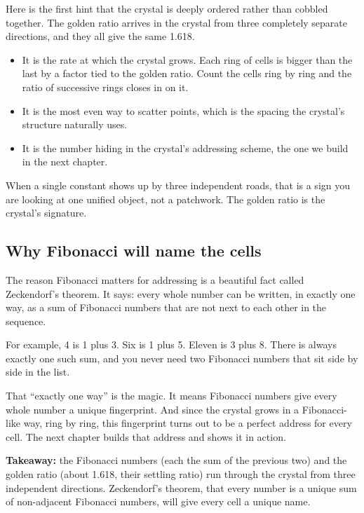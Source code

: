 Here is the first hint that the crystal is deeply ordered rather than cobbled together. The golden ratio arrives in the crystal from three completely separate directions, and they all give the same 1.618.

\begin{itemize}
\item It is the rate at which the crystal grows. Each ring of cells is bigger than the last by a factor tied to the golden ratio. Count the cells ring by ring and the ratio of successive rings closes in on it.
\item It is the most even way to scatter points, which is the spacing the crystal's structure naturally uses.
\item It is the number hiding in the crystal's addressing scheme, the one we build in the next chapter.
\end{itemize}

When a single constant shows up by three independent roads, that is a sign you are looking at one unified object, not a patchwork. The golden ratio is the crystal's signature.

\subsection{Why Fibonacci will name the cells}

The reason Fibonacci matters for addressing is a beautiful fact called Zeckendorf's theorem. It says: every whole number can be written, in exactly one way, as a sum of Fibonacci numbers that are not next to each other in the sequence.

For example, 4 is 1 plus 3. Six is 1 plus 5. Eleven is 3 plus 8. There is always exactly one such sum, and you never need two Fibonacci numbers that sit side by side in the list.

That ``exactly one way'' is the magic. It means Fibonacci numbers give every whole number a unique fingerprint. And since the crystal grows in a Fibonacci-like way, ring by ring, this fingerprint turns out to be a perfect address for every cell. The next chapter builds that address and shows it in action.

\textbf{Takeaway:} the Fibonacci numbers (each the sum of the previous two) and the golden ratio (about 1.618, their settling ratio) run through the crystal from three independent directions. Zeckendorf's theorem, that every number is a unique sum of non-adjacent Fibonacci numbers, will give every cell a unique name.
